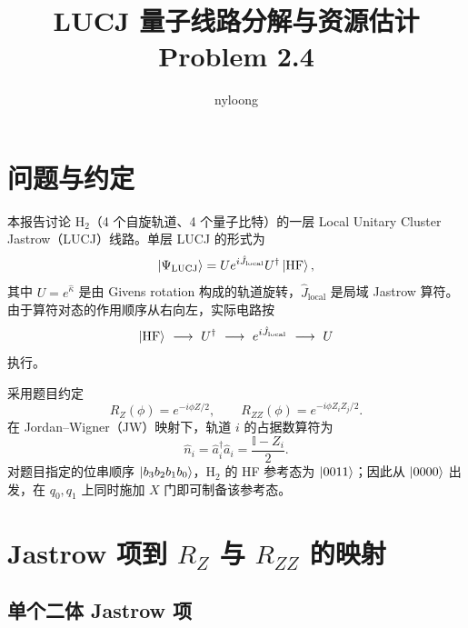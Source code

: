 \documentclass[11pt,a4paper]{ctexart}
\title{LUCJ 量子线路分解与资源估计\\\large Problem 2.4}
\author{nyloong}
\date{}
\newcommand{\Id}{\mathbb{I}}
\newcommand{\RZ}{R_{Z}}
\newcommand{\RZZ}{R_{ZZ}}
\begin{document}
\maketitle

\section{问题与约定}

本报告讨论 H$_2$（4 个自旋轨道、4 个量子比特）的一层 Local Unitary Cluster Jastrow（LUCJ）线路。单层 LUCJ 的形式为
\begin{equation}
    \ket{\Psi_{\mathrm{LUCJ}}}=Ue^{i\hat J_{\mathrm{local}}}U^\dagger\ket{\mathrm{HF}},
    \label{eq:lucj}
\end{equation}
其中 $U=e^{\hat\kappa}$ 是由 Givens rotation 构成的轨道旋转，$\hat J_{\mathrm{local}}$ 是局域 Jastrow 算符。由于算符对态的作用顺序从右向左，实际电路按
\begin{equation}
    \ket{\mathrm{HF}}\ \longrightarrow\ U^\dagger\ \longrightarrow\ e^{i\hat J_{\mathrm{local}}}\ \longrightarrow\ U
    \label{eq:time-order}
\end{equation}
执行。

采用题目约定
\begin{equation}
    \RZ(\phi)=e^{-i\phi Z/2},\qquad
    \RZZ(\phi)=e^{-i\phi Z_iZ_j/2}.
\end{equation}
在 Jordan--Wigner（JW）映射下，轨道 $i$ 的占据数算符为
\begin{equation}
    \hat n_i=\hat a_i^\dagger\hat a_i=\frac{\Id-Z_i}{2}.
    \label{eq:number}
\end{equation}
对题目指定的位串顺序 $\ket{b_3b_2b_1b_0}$，H$_2$ 的 HF 参考态为 $\ket{0011}$；因此从 $\ket{0000}$ 出发，在 $q_0,q_1$ 上同时施加 $X$ 门即可制备该参考态。

\section{Jastrow 项到 $R_Z$ 与 $R_{ZZ}$ 的映射}

\subsection{单个二体 Jastrow 项}
\end{document}

